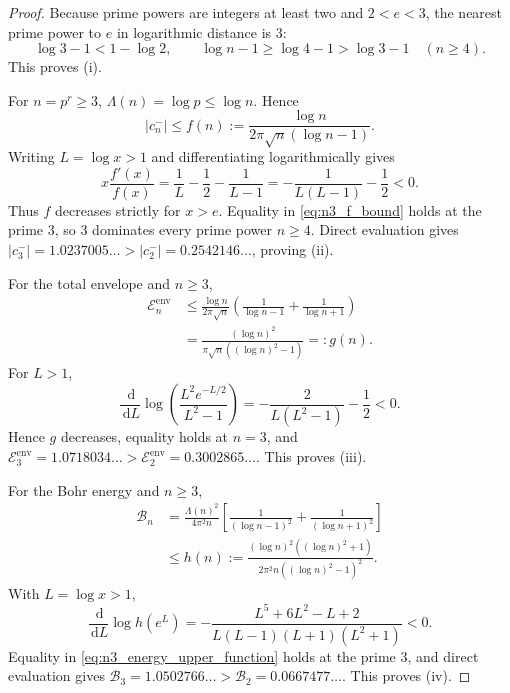 \documentclass[11pt]{amsart}
\numberwithin{equation}{section}
\theoremstyle{plain}
\theoremstyle{definition}
\theoremstyle{remark}
\newcommand{\1}{\mathbf{1}}
\newcommand{\dd}{\,\mathrm{d}}
\begin{document}
\begin{proof}
Because prime powers are integers at least two and $2<e<3$, the nearest
prime power to $e$ in logarithmic distance is $3$:
\begin{equation}
\log3-1<1-\log2,
\qquad
\log n-1\geq\log4-1>\log3-1
\quad(n\geq4).
\label{eq:n3_unique_detuning_proof}
\end{equation}
This proves (i).

For $n=p^r\geq3$, $\Lambda(n)=\log p\leq\log n$.  Hence
\begin{equation}
|c_n^-|
\leq
f(n)
:=
\frac{\log n}{2\pi\sqrt n(\log n-1)}.
\label{eq:n3_f_bound}
\end{equation}
Writing $L=\log x>1$ and differentiating logarithmically gives
\begin{equation}
x\frac{f'(x)}{f(x)}
=
\frac1L-\frac12-\frac1{L-1}
=
-\frac1{L(L-1)}-\frac12<0.
\label{eq:n3_f_monotone}
\end{equation}
Thus $f$ decreases strictly for $x>e$.  Equality in
\eqref{eq:n3_f_bound} holds at the prime $3$, so $3$ dominates every
prime power $n\geq4$.  Direct evaluation gives
\(|c_3^-|=1.0237005\ldots>|c_2^-|=0.2542146\ldots\), proving (ii).

For the total envelope and $n\geq3$,
\begin{align}
\mathscr E_n^{\mathrm{env}}
&\leq
\frac{\log n}{2\pi\sqrt n}
\left(\frac1{\log n-1}+\frac1{\log n+1}\right)
\label{eq:n3_envelope_bound_one}
\\
&=
\frac{(\log n)^2}{\pi\sqrt n((\log n)^2-1)}
=:g(n).
\label{eq:n3_envelope_bound_two}
\end{align}
For $L>1$,
\begin{equation}
\frac{\dd}{\dd L}\log\!\left(
\frac{L^2e^{-L/2}}{L^2-1}
\right)
=
-\frac2{L(L^2-1)}-\frac12<0.
\label{eq:n3_g_monotone}
\end{equation}
Hence $g$ decreases, equality holds at $n=3$, and
\(\mathscr E_3^{\mathrm{env}}=1.0718034\ldots>\mathscr E_2^{\mathrm{env}}=0.3002865\ldots\).
This proves (iii).

For the Bohr energy and $n\geq3$,
\begin{align}
\mathcal B_n
&=
\frac{\Lambda(n)^2}{4\pi^2n}
\left[\frac1{(\log n-1)^2}+\frac1{(\log n+1)^2}\right]
\label{eq:n3_energy_exact_general}
\\
&\leq
h(n)
:=
\frac{(\log n)^2((\log n)^2+1)}
{2\pi^2n((\log n)^2-1)^2}.
\label{eq:n3_energy_upper_function}
\end{align}
With $L=\log x>1$,
\begin{equation}
\frac{\dd}{\dd L}\log h(e^L)
=
-\frac{L^5+6L^2-L+2}
{L(L-1)(L+1)(L^2+1)}<0.
\label{eq:n3_energy_monotone}
\end{equation}
Equality in \eqref{eq:n3_energy_upper_function} holds at the prime $3$,
and direct evaluation gives
\(\mathcal B_3=1.0502766\ldots>\mathcal B_2=0.0667477\ldots\).
This proves (iv).


\end{proof}
\end{document}
